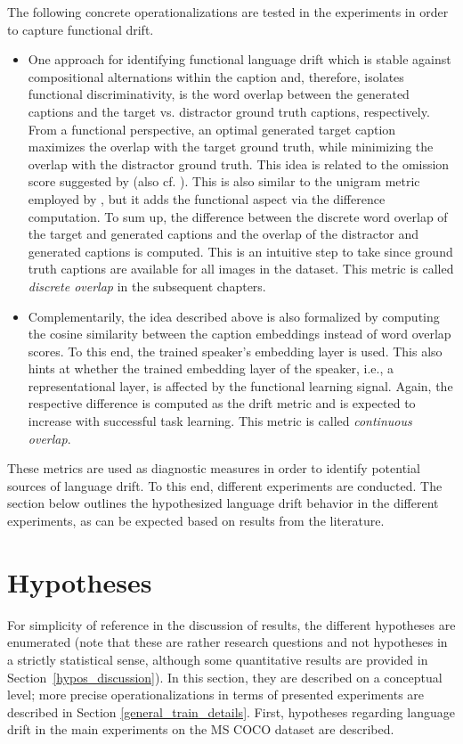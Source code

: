 The following concrete operationalizations are tested in the experiments in order to capture functional drift. \begin{itemize}
	\item One approach for identifying functional language drift which is stable against compositional alternations within the caption and, therefore, isolates functional discriminativity, is the word overlap between the generated captions and the target vs. distractor ground truth captions, respectively. From a functional perspective, an optimal generated target caption maximizes the overlap with the target ground truth, while minimizing the overlap with the distractor ground truth. This idea is related to the omission score suggested by \cite{havrylov2017emergence} (also cf. \cite{andreas2016reasoning, gunel2020supervised}). This is also similar to the unigram metric employed by \cite{lazaridou2020multi}, but it adds the functional aspect via the difference computation. To sum up, the difference between the discrete word overlap of the target and generated captions and the overlap of the distractor and generated captions is computed. This is an intuitive step to take since ground truth captions are available for all images in the dataset. This metric is called \textit{discrete overlap} in the subsequent chapters.
	\item Complementarily, the idea described above is also formalized by computing the cosine similarity between the caption embeddings instead of word overlap scores. To this end, the trained speaker's embedding layer is used. This also hints at whether the trained embedding layer of the speaker, i.e., a representational layer, is affected by the functional learning signal. Again, the respective difference is computed as the drift metric and is expected to increase with successful task learning. This metric is called \textit{continuous overlap}.
\end{itemize}
These metrics are used as diagnostic measures in order to identify potential sources of language drift. To this end, different experiments are conducted. The section below outlines the hypothesized language drift behavior in the different experiments, as can be expected based on results from the literature.

\section{Hypotheses}
\label{hypos}

For simplicity of reference in the discussion of results, the different hypotheses are enumerated (note that these are rather research questions and not hypotheses in a strictly statistical sense, although some quantitative results are provided in Section~\ref{hypos_discussion}). In this section, they are described on a conceptual level; more precise operationalizations in terms of presented experiments are described in Section \ref{general_train_details}.
First, hypotheses regarding language drift in the main experiments on the MS COCO dataset are described. 

